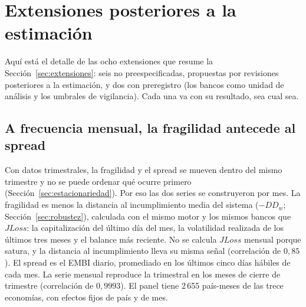 \chapter{Extensiones posteriores a la estimación}
\label{chap:anexo-extensiones}

Aquí está el detalle de las ocho extensiones que resume la Sección~\ref{sec:extensiones}: seis no preespecificadas, propuestas por revisiones posteriores a la estimación, y dos con preregistro (los bancos como unidad de análisis y los umbrales de vigilancia). Cada una va con su resultado, sea cual sea.

\section{A frecuencia mensual, la fragilidad antecede al spread}
\label{sec:mensual}

Con datos trimestrales, la fragilidad y el spread se mueven dentro del mismo trimestre y no se puede ordenar qué ocurre primero (Sección~\ref{sec:estacionariedad}). Por eso las dos series se construyeron por mes. La fragilidad es menos la distancia al incumplimiento media del sistema ($-DD_w$; Sección~\ref{sec:robustez}), calculada con el mismo motor y los mismos bancos que $JLoss$: la capitalización del último día del mes, la volatilidad realizada de los últimos tres meses y el balance más reciente. No se calcula $JLoss$ mensual porque satura, y la distancia al incumplimiento lleva su misma señal (correlación de $0{,}85$). El spread es el EMBI diario, promediado en los últimos cinco días hábiles de cada mes. La serie mensual reproduce la trimestral en los meses de cierre de trimestre (correlación de $0{,}9993$). El panel tiene 2\,655 país-meses de las trece economías, con efectos fijos de país y de mes.

